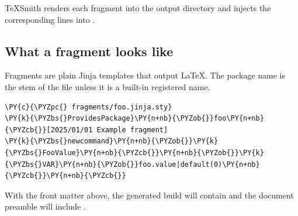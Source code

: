 \documentclass[a4paper,twoside]{article}
\begin{document}
TeXSmith renders each fragment into the output directory and injects the
corresponding  lines into .
\subsection{What a fragment looks like}
Fragments are plain Jinja templates that output \LaTeX{}. The package name is the
stem of the file unless it is a built-in registered name.
\begin{tscode}[lang=tex, engine=pygments]
\begin{Verbatim}[commandchars=\\\{\},breaklines, breakanywhere, commandchars=\\\{\}]
\PY{c}{\PYZpc{} fragments/foo.jinja.sty}
\PY{k}{\PYZbs{}ProvidesPackage}\PY{n+nb}{\PYZob{}}foo\PY{n+nb}{\PYZcb{}}[2025/01/01 Example fragment]
\PY{k}{\PYZbs{}newcommand}\PY{n+nb}{\PYZob{}}\PY{k}{\PYZbs{}FooValue}\PY{n+nb}{\PYZcb{}}\PY{n+nb}{\PYZob{}}\PY{k}{\PYZbs{}VAR}\PY{n+nb}{\PYZob{}}foo.value|default(0)\PY{n+nb}{\PYZcb{}}\PY{n+nb}{\PYZcb{}}
\end{Verbatim}
\end{tscode}
With the front matter above, the generated build will contain  and the
document preamble will include .
\end{document}
